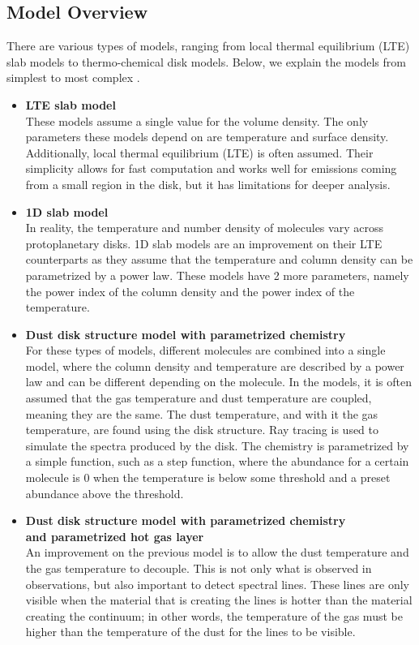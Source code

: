 \documentclass[oneside, single, authoryear, semicolon, 12pt]{lion-msc}
\newcommand{\4}{$_4$}
\newcommand{\3}{$_3$}
\newcommand{\2}{$_2$}
\begin{document}
\subsection{Model Overview}
There are various types of models, ranging from local thermal equilibrium (LTE) slab models to thermo-chemical disk models. Below, we explain the models from simplest to most complex \citep{chap13}.
\begin{itemize}
    \item \textbf{LTE slab model} \\
    These models assume a single value for the volume density. The only parameters these models depend on are temperature and surface density. Additionally, local thermal equilibrium (LTE) is often assumed. Their simplicity allows for fast computation and works well for emissions coming from a small region in the disk, but it has limitations for deeper analysis.

    \item \textbf{1D slab model} \\
    In reality, the temperature and number density of molecules vary across protoplanetary disks. 1D slab models are an improvement on their LTE counterparts as they assume that the temperature and column density can be parametrized by a power law. These models have 2 more parameters, namely the power index of the column density and the power index of the temperature.

    \item \textbf{Dust disk structure model with parametrized chemistry} \\
    For these types of models, different molecules are combined into a single model, where the column density and temperature are described by a power law and can be different depending on the molecule. In the models, it is often assumed that the gas temperature and dust temperature are coupled, meaning they are the same. The dust temperature, and with it the gas temperature, are found using the disk structure. Ray tracing is used to simulate the spectra produced by the disk. The chemistry is parametrized by a simple function, such as a step function, where the abundance for a certain molecule is 0 when the temperature is below some threshold and a preset abundance above the threshold.

    \item \textbf{Dust disk structure model with parametrized chemistry\\ and parametrized hot gas layer} \\
    An improvement on the previous model is to allow the dust temperature and the gas temperature to decouple. This is not only what is observed in observations, but also important to detect spectral lines. These lines are only visible when the material that is creating the lines is hotter than the material creating the continuum; in other words, the temperature of the gas must be higher than the temperature of the dust for the lines to be visible.


\end{itemize}
\end{document}
